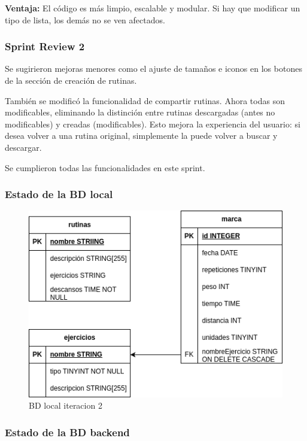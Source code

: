 \textbf{Ventaja:} El c\'odigo es m\'as limpio, escalable y modular. Si hay que modificar un tipo de lista, los dem\'as no se ven afectados.

\subsubsection{Sprint Review 2}
Se sugirieron mejoras menores como el ajuste de tama\~nos e iconos en los botones de la secci\'on de creaci\'on de rutinas.

Tambi\'en se modific\'o la funcionalidad de compartir rutinas. Ahora todas son modificables, eliminando la distinci\'on entre rutinas descargadas (antes no modificables) y creadas (modificables). Esto mejora la experiencia del usuario: si desea volver a una rutina original, simplemente la puede volver a buscar y descargar.

Se cumplieron todas las funcionalidades en este sprint.

\subsubsection{Estado de la BD local}

\begin{figure}[H]
   \centering
    \includegraphics[width=\textwidth]{fotos/BDL iteracion 2.png}
    \caption{BD local iteracion 2}
    \label{fig:BD local iteracion 2}
\end{figure}


\subsubsection{Estado de la BD backend} %

